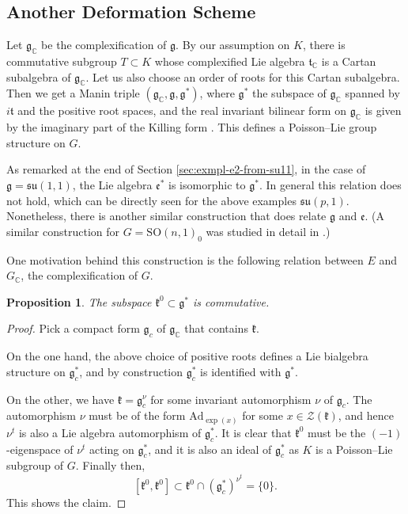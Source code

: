 \documentclass[a4paper,11pt]{amsart}
\newcommand{\C}{\mathbb C}
\newcommand{\s}[1]{\mathcal{#1}}
\newcommand{\fr}[1]{\mathfrak{#1}}
\newcommand{\Ad}{\mathrm{Ad}}
\newcommand{\SO}{\mathrm{SO}}
\newtheorem{prop}[thm]{Proposition}
\theoremstyle{definition}
\theoremstyle{remark}
\begin{document}
\subsection{Another Deformation Scheme}

Let $\fr{g}_\C$ be the complexification of $\fr{g}$.
By our assumption on $K$, there is commutative subgroup $T \subset K$ whose complexified Lie algebra $\fr{t}_\C$ is a Cartan subalgebra of $\fr{g}_\C$.
Let us also choose an order of roots for this Cartan subalgebra.
Then we get a Manin triple $(\fr{g}_\C,\fr{g},\fr{g}^*)$, where $\fr{g}^*$ the subspace of $\fr{g}_\C$ spanned by $i\fr{t}$ and the positive root spaces, and the real invariant bilinear form on $\fr{g}_\C$ is given by the imaginary part of the Killing form \cite{MR1284791}.
This defines a Poisson--Lie group structure on $G$.

As remarked at the end of Section \ref{sec:exmpl-e2-from-su11}, in the case of $\fr g = \fr{su}(1,1)$, the Lie algebra $\fr{e}^*$ is isomorphic to $\fr{g}^*$.
In general this relation does not hold, which can be directly seen for the above examples $\fr{su}(p, 1)$.
Nonetheless, there is another similar construction that does relate $\fr g$ and $\fr e$.
(A similar construction for $G = \SO(n,1)_0$ was studied in detail in \cite{arXiv:q-alg/9712040}.)

One motivation behind this construction is the following relation between $E$ and $G_\C$, the complexification of $G$.


\begin{prop}
The subspace $\fr{k}^0 \subset \fr{g}^*$ is commutative.
\end{prop}

\begin{proof}
Pick a compact form $\fr{g}_c$ of $\fr{g}_\C$ that contains $\fr{k}$.

On the one hand, the above choice of positive roots defines a Lie bialgebra structure on $\fr{g}_c^*$, and by construction $\fr{g}_c^*$ is identified with $\fr{g}^*$.

On the other, we have $\fr{k} = \fr{g}_c^\nu$ for some invariant automorphism $\nu$ of $\fr{g}_c$.
The automorphism $\nu$ must be of the form $\Ad_{\exp(x)}$ for some $x \in \s{Z}(\fr{k})$, and hence $\nu^t$ is also a Lie algebra automorphism of $\fr{g}_c^*$.
It is clear that $\fr{k}^0$ must be the $(-1)$-eigenspace of $\nu^t$ acting on $\fr{g}_c^*$, and it is also an ideal of $\fr{g}_c^*$ as $K$ is a Poisson--Lie subgroup of $G$.
Finally then,
\[
\left[ \fr{k}^0 , \fr{k}^0 \right] \subset \fr{k}^0 \cap \left( \fr{g}_c^* \right)^{\nu^t} = \{ 0 \} .
\]
This shows the claim.
\end{proof}
\end{document}
